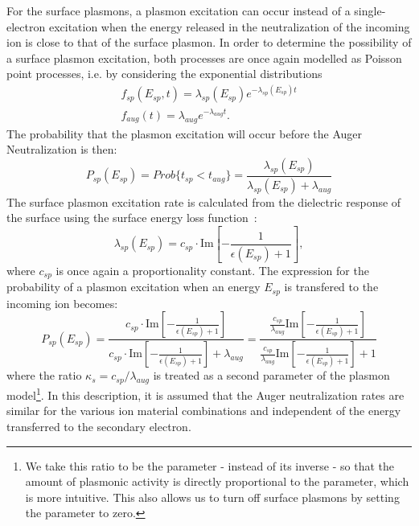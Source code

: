 \begin{refsection}
For the surface plasmons, a plasmon excitation can occur instead of a 
single-electron excitation when the energy released in the neutralization of 
the incoming ion is close to that of the surface plasmon. In order to determine the 
possibility of a surface plasmon excitation, both processes are once again 
modelled as Poisson point processes, i.e. by considering the exponential 
distributions
\begin{eqnarray} 
f_{sp}(E_{sp}, t) = \lambda_{sp} (E_{sp}) e^{-\lambda_{sp}(E_{sp}) t}\\ 
f_{aug}(t) = \lambda_{aug} e^{-\lambda_{aug} t}.
\end{eqnarray} 
The probability that the plasmon excitation will occur 
before the Auger Neutralization is then: 
\begin{equation} 
P_{sp}(E_{sp}) = Prob\{t_{sp} < t_{aug}\} = 
\frac{\lambda_{sp}(E_{sp})}{\lambda_{sp}(E_{sp}) + \lambda_{aug}} 
\end{equation} 
The surface plasmon excitation rate is calculated from the dielectric response of 
the surface using the surface energy loss function~\cite{Raether1980}: 
\begin{equation} 
\lambda_{sp}(E_{sp}) = c_{sp} \cdot \text{Im}\left[-\frac{1}{\epsilon(E_{sp}) 
+ 1}\right],
\end{equation} 
where $c_{sp}$ is once again a proportionality constant.
The expression for the probability of a plasmon 
excitation when an energy $E_{sp}$ is transfered to the incoming ion becomes: 
\begin{equation} \label{quotas:eq-sp_prob}
P_{sp}(E_{sp}) = \frac{c_{sp} \cdot \text{Im}\left[-\frac{1}{\epsilon(E_{sp}) + 
1}\right]}{c_{sp}  \cdot \text{Im}\left[-\frac{1}{\epsilon(E_{sp}) + 1}\right] + 
\lambda_{aug}} = \frac{ \frac{c_{sp}}{\lambda_{aug}} 
\text{Im}\left[-\frac{1}{\epsilon(E_{sp}) + 1}\right]}{\frac{c_{sp}}{\lambda_{aug}} 
\text{Im}\left[-\frac{1}{\epsilon(E_{sp}) + 1}\right] + 1} 
\end{equation} 
where the ratio $\kappa_s = c_{sp}/\lambda_{aug}$ is treated as a second parameter 
of the plasmon model\footnote{We take this ratio to be the parameter - instead 
of its inverse - so that the amount of plasmonic activity is directly 
proportional to the parameter, which is more intuitive. This also allows us to 
turn off surface plasmons by setting the parameter to zero.}. In this 
description, it is assumed that the Auger neutralization rates are similar 
for the various ion material combinations and independent of the energy 
transferred to the secondary electron. 
 

\end{refsection}
